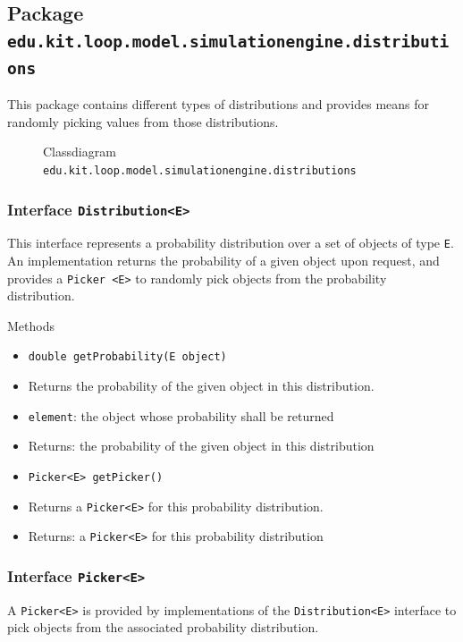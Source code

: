 \documentclass[parskip=full,11pt]{scrartcl}
\begin{document}
\subsection{Package \texttt{edu.kit.loop.model.simulationengine.distributions}}

This package contains different types of distributions and provides means for randomly picking values from those distributions.

\iftrue
\begin{figure}[h]
	\centering
	\fontsize{6}{8}\selectfont
	

	\caption{Classdiagram \texttt{edu.kit.loop.model.simulationengine.distributions}}
\end{figure}
\fi
\newpage
\subsubsection{Interface \texttt{Distribution<E>}}
This interface represents a probability distribution over a set of objects of type \texttt{E}. An implementation returns the probability of a given object upon request, and provides a \texttt{Picker <E>} to randomly pick objects from the probability distribution.

Methods
\begin{itemize}\itemsep -10pt
\item \texttt{double getProbability(E object)}
\item[] Returns the probability of the given object in this distribution.
\item[] \texttt{element}: the object whose probability shall be returned
\item[] Returns: the probability of the given object in this distribution

\item \texttt{Picker<E> getPicker()}
\item[] Returns a \texttt{Picker<E>} for this probability distribution.
\item[] Returns: a \texttt{Picker<E>} for this probability distribution
\end{itemize}

\subsubsection{Interface \texttt{Picker<E>}}
A \texttt{Picker<E>} is provided by implementations of the \texttt{Distribution<E>} interface to pick objects from the associated probability distribution.
\end{document}
